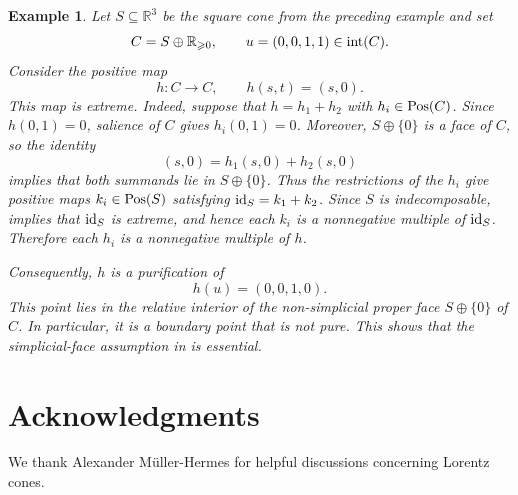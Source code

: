 \documentclass[11pt]{article}
\newcommand\barbelow[1]{\stackunder[1.5pt]{$\hspace{2pt}#1\hspace{2pt}$}{\rule{1ex}{0.075ex}}}
\newcommand{\barabove}[1]{\hspace{2pt}\bar{#1}\hspace{2pt}}
\theoremstyle{result}
\theoremstyle{discussion}
\newtheorem{definition}[definition]{Definition}
\newtheorem{example}[example]{Example}
\newcommand{\omin}{\barbelow{\otimes}}
\newcommand{\omax}{\barabove{\otimes}}
\begin{document}
\begin{example}
    Let $S\subseteq\mathbb R^3$ be the square cone from the preceding
    example and set
    \[
        C=S\oplus\mathbb R_{\geqslant0},
        \qquad
        u=(0,0,1,1)\in{\rm int}(C).
    \]
    Consider the positive map
    \[
        h\colon C\to C,
        \qquad
        h(s,t)=(s,0).
    \]
    This map is extreme. Indeed, suppose that $h=h_1+h_2$ with
    $h_i\in{\rm Pos}(C)$. Since $h(0,1)=0$, salience of $C$ gives
    $h_i(0,1)=0$. Moreover, $S\oplus\{0\}$ is a face of $C$, so the identity
    \[
        (s,0)=h_1(s,0)+h_2(s,0)
    \]
    implies that both summands lie in $S\oplus\{0\}$. Thus the restrictions
    of the $h_i$ give positive maps $k_i\in{\rm Pos}(S)$ satisfying
    ${\rm id}_S=k_1+k_2$. Since $S$ is indecomposable,
     implies that ${\rm id}_S$ is extreme,
    and hence each $k_i$ is a nonnegative multiple of ${\rm id}_S$.
    Therefore each $h_i$ is a nonnegative multiple of $h$.

    Consequently, $h$ is a purification of
    \[
        h(u)=(0,0,1,0).
    \]
    This point lies in the relative interior of the non-simplicial proper
    face $S\oplus\{0\}$ of $C$. In particular, it is a boundary point that
    is not pure. This shows that the simplicial-face assumption in  is essential.
\end{example}

\section*{Acknowledgments}
We thank Alexander M\"uller-Hermes for helpful discussions concerning
Lorentz cones.




\end{document}
